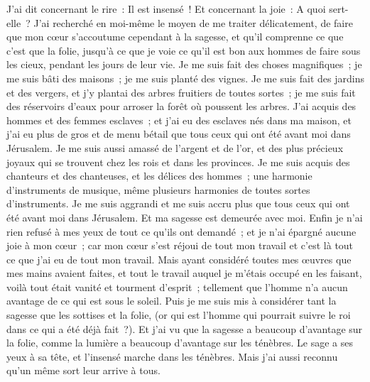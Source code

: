 \begin{multicols}{2}
J'ai dit concernant le rire~: Il est insensé~! Et concernant la joie~: A quoi sert-elle~?
J'ai recherché en moi-même le moyen de me traiter délicatement, de faire que mon cœur s'accoutume cependant à la sagesse, et qu'il comprenne ce que c'est que la folie, jusqu'à ce que je voie ce qu'il est bon aux hommes de faire sous les cieux, pendant les jours de leur vie. 
Je me suis fait des choses magnifiques~; je me suis bâti des maisons~; je me suis planté des vignes.
Je me suis fait des jardins et des vergers, et j'y plantai des arbres fruitiers de toutes sortes~;
je me suis fait des réservoirs d'eaux pour arroser la forêt où poussent les arbres.
J'ai acquis des hommes et des femmes esclaves~; et j'ai eu des esclaves nés dans ma maison, et j'ai eu plus de gros et de menu bétail que tous ceux qui ont été avant moi dans Jérusalem. 
Je me suis aussi amassé de l'argent et de l'or, et des plus précieux joyaux qui se trouvent chez les rois et dans les provinces. Je me suis acquis des chanteurs et des chanteuses, et les délices des hommes~; une harmonie d'instruments de musique, même plusieurs harmonies de toutes sortes d'instruments. 
Je me suis aggrandi et me suis accru plus que tous ceux qui ont été avant moi dans Jérusalem. Et ma sagesse est demeurée avec moi.
Enfin je n'ai rien refusé à mes yeux de tout ce qu'ils ont demandé~; et je n'ai épargné aucune joie à mon cœur~; car mon cœur s'est réjoui de tout mon travail et c'est là tout ce que j'ai eu de tout mon travail.
Mais ayant considéré toutes mes œuvres que mes mains avaient faites, et tout le travail auquel je m'étais occupé en les faisant, voilà tout était vanité et tourment d'esprit~; tellement que l'homme n'a aucun avantage de ce qui est sous le soleil.
Puis je me suis mis à considérer tant la sagesse que les sottises et la folie, (or qui est l'homme qui pourrait suivre le roi dans ce qui a été déjà fait~?).
Et j'ai vu que la sagesse a beaucoup d'avantage sur la folie, comme la lumière a beaucoup d'avantage sur les ténèbres.
Le sage a ses yeux à sa tête, et l'insensé marche dans les ténèbres. Mais j'ai aussi reconnu qu'un même sort leur arrive à tous.

\end{multicols}
